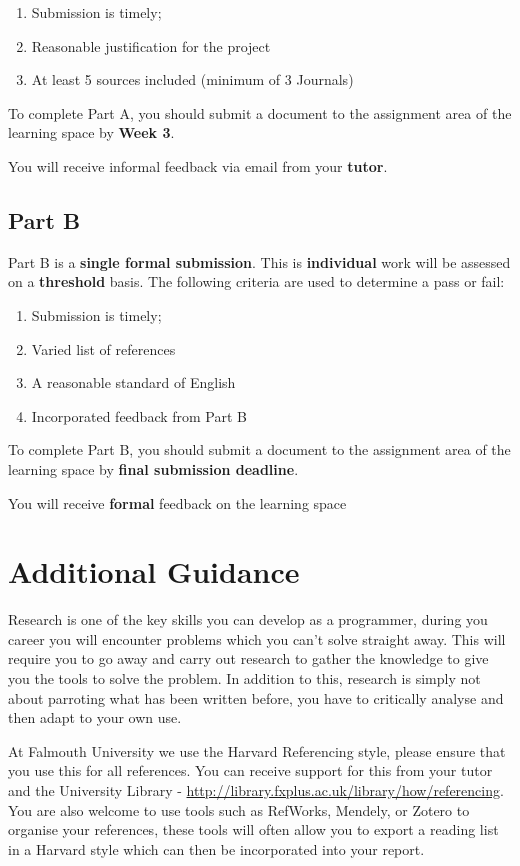 \documentclass{../../fal_assignment}
\begin{document}
\begin{enumerate}[label=(\alph*)]
	\item Submission is timely;
	\item Reasonable justification for the project
	\item At least 5 sources included (minimum of 3 Journals)
\end{enumerate}

To complete Part A, you should submit a document to the assignment area of the learning space by \textbf{Week 3}.

You will receive informal feedback via email from your \textbf{tutor}.


\subsection*{Part B}

Part B is a \textbf{single formal submission}. This is \textbf{individual} work will be assessed on a \textbf{threshold} basis. The following criteria are used to determine a pass or fail: 

\begin{enumerate}[label=(\alph*)]
	\item Submission is timely;
	\item Varied list of references
	\item A reasonable standard of English
	\item Incorporated feedback from Part B
\end{enumerate}

To complete Part B, you should submit a document to the assignment area of the learning space by \textbf{final submission deadline}.

You will receive \textbf{formal} feedback on the learning space

\section*{Additional Guidance}
Research is one of the key skills you can develop as a programmer, during you career you will encounter problems which you can't solve straight away. This will require you to go away and carry out research to gather the knowledge to give you the tools to solve the problem. In addition to this, research is simply not about parroting what has been written before, you have to critically analyse and then adapt to your own use.

At Falmouth University we use the Harvard Referencing style, please ensure that you use this  for all references. You can receive support for this from your tutor and the University Library - \url{http://library.fxplus.ac.uk/library/how/referencing}. You are also welcome to use tools such as RefWorks, Mendely, or Zotero to organise your references, these tools will often allow you to export a reading list in a Harvard style which can then be incorporated into your report.
\end{document}
